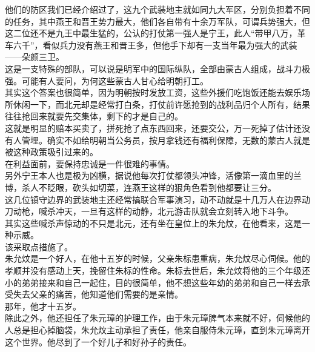 \begin{multicols}{\theparacolNo}
他们的防区我们已经介绍过了，这九个武装地主就如同九大军区，分别负担着不同的任务，其中燕王和晋王势力最大，他们各自带有十余万军队，可谓兵势强大，但这二位还不是九王中最生猛的，公认的打仗第一强人是宁王，此人“带甲八万，革车六千”，看似兵力没有燕王和晋王多，但他手下却有一支当年最为强大的武装——朵颜三卫。\\

这是一支特殊的部队，可以说是明军中的国际纵队，全部由蒙古人组成，战斗力极强。可能有人要问，为何这些蒙古人甘心给明朝打工。\\

其实这个答案也很简单，因为明朝按时发放工资，这些外援们吃饱饭还能去娱乐场所休闲一下，而北元却是经常打白条，打仗前许愿抢到的战利品归个人所有，结果往往抢回来就要先交集体，剩下的才是自己的。\\

这就是明显的赔本买卖了，拼死抢了点东西回来，还要交公，万一死掉了估计还没有人管埋。确实不如给明朝当公务员，按月拿钱还有福利保障，无数的蒙古人就是被这种政策吸引过来的。\\

在利益面前，要保持忠诚是一件很难的事情。\\

另外宁王本人也是极为凶横，据说他每次打仗都领头冲锋，活像第一滴血里的兰博，杀人不眨眼，砍头如切菜，连燕王这样的狠角色看到他都要让三分。\\

这几位镇守边界的武装地主还经常搞联合军事演习，动不动就是十几万人在边界动刀动枪，喊杀冲天，一旦有这样的动静，北元游击队就会立刻转入地下斗争。\\

其实这些喊杀声惊动的不只是北元，还有坐在皇位上的朱允炆，在他看来，这是一种示威。\\

该采取点措施了。\\

朱允炆是一个好人，在他十五岁的时候，父亲朱标患重病，朱允炆尽心伺候。他的孝顺并没有感动上天，挽留住朱标的性命。朱标去世后，朱允炆将他的三个年级还小的弟弟接来和自己一起住，目的很简单，他不想这些年幼的弟弟和自己一样去承受失去父亲的痛苦，他知道他们需要的是亲情。\\

那年，他才十五岁。\\

除此之外，他还担任了朱元璋的护理工作，由于朱元璋脾气本来就不好，伺候他的人总是担心掉脑袋，朱允炆主动承担了责任，他亲自服侍朱元璋，直到朱元璋离开这个世界。他尽到了一个好儿子和好孙子的责任。\\


\end{multicols}

